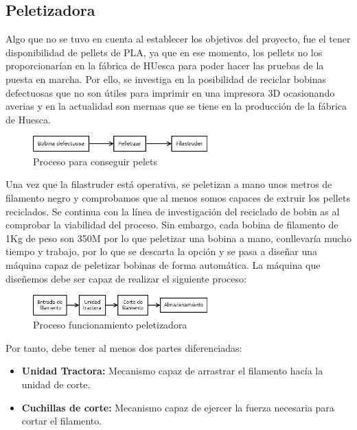 \subsection{Peletizadora}
\label{sec:peletizadora}

Algo que no se tuvo en cuenta al establecer los objetivos del proyecto, fue el tener disponibilidad de pellets de PLA, ya que en ese momento, los pellets no los proporcionarían en la fábrica de HUesca para poder hacer las pruebas de la puesta en marcha. Por ello, se investiga en la posibilidad de reciclar bobinas defectuosas que no son útiles para imprimir en una impresora 3D ocasionando averias y en la actualidad son mermas que se tiene en la producción de la fábrica de Huesca.

    \begin{figure}[H]
            \centering
            \includegraphics[width=0.6\textwidth]{images/peletizadora/Diagram.png}
            \caption{Proceso para conseguir pelets}
            \label{fig:peletizadora_diagram}
    \end{figure}

Una vez que la filastruder está operativa, se peletizan a mano unos metros de filamento negro y comprobamos que al menos somos capaces de extruir los pellets reciclados. Se continua con la línea de investigación del reciclado de bobin as al comprobar la viabilidad del proceso. Sin embargo, cada bobina de filamento de 1Kg de peso son 350M por lo que peletizar una bobina a mano, conllevaría mucho tiempo y trabajo, por lo que se descarta la opción y se pasa a diseñar una máquina capaz de peletizar bobinas de forma automática. La máquina que diseñemos debe ser capaz de realizar el siguiente proceso:

    \begin{figure}[H]
            \centering
            \includegraphics[width=0.6\textwidth]{images/peletizadora/Diagram2.png}
            \caption{Proceso funcionamiento peletizadora}
            \label{fig:peletizadora_diagram2}
    \end{figure}

Por tanto, debe tener al menos dos partes diferenciadas:

\begin{itemize}
		\item{\textbf{Unidad Tractora:} Mecanismo capaz de arrastrar el filamento hacía la unidad de corte.}
		\item{\textbf{Cuchillas de corte:} Mecanismo capaz de ejercer la fuerza necesaria para cortar el filamento.}
\end{itemize}

